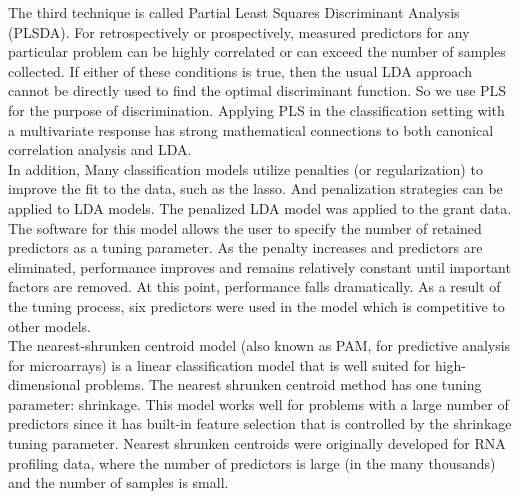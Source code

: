 \documentclass{article}%
\begin{document}
\indent The third technique is called Partial Least Squares Discriminant Analysis (PLSDA). For retrospectively or prospectively, measured predictors for any particular problem can be highly correlated or can exceed the number of samples collected. If either of these conditions is true, then the usual LDA approach cannot be directly used to find the optimal discriminant function. So we use PLS for the purpose of discrimination. Applying PLS in the classification setting with a multivariate response has strong mathematical connections to both canonical correlation analysis and LDA.\\
\indent In addition, Many classification models utilize penalties (or regularization) to improve the fit to the data, such as the lasso. And penalization strategies can be applied to LDA models. The penalized LDA model was applied to the grant data. The software for this model allows the user to specify the number of retained predictors as a tuning parameter. As the penalty increases and predictors are eliminated, performance improves and remains relatively constant until
important factors are removed. At this point, performance falls dramatically. As a result of the tuning process, six predictors were used in the model which is competitive to other models.\\
\indent The nearest-shrunken centroid model (also known as PAM, for predictive analysis for microarrays) is a linear classification model that is well suited for high-dimensional problems. The nearest shrunken centroid method has one tuning parameter: shrinkage. This model works well for problems with a large number of predictors since it has built-in feature selection that is controlled by the shrinkage tuning parameter. Nearest shrunken centroids were originally developed for RNA profiling data, where the number of predictors is large (in the many thousands) and the number of samples is small.

%
\end{document}
